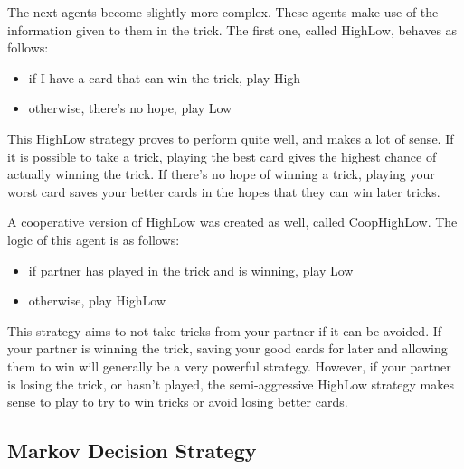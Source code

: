 The next agents become slightly more complex. These agents make use of the information given to them in the trick. The first one,
called HighLow, behaves as follows:
\begin{itemize}[noitemsep, label={}]
    \item if I have a card that can win the trick, play High
    \item otherwise, there's no hope, play Low
\end{itemize}
This HighLow strategy proves to perform quite well, and makes a lot of sense. If it is possible to take a trick, playing the best card
gives the highest chance of actually winning the trick. If there's no hope of winning a trick, playing your worst card
saves your better cards in the hopes that they can win later tricks.

A cooperative version of HighLow was created as well, called CoopHighLow. The logic of this agent is as follows:
\begin{itemize}[noitemsep, label={}]
    \item if partner has played in the trick and is winning, play Low
    \item otherwise, play HighLow
\end{itemize}
This strategy aims to not take tricks from your partner if it can be avoided. If your partner is winning the trick, saving your good cards for
later and allowing them to win will generally be a very powerful strategy. However, if your partner is losing the trick, or hasn't played,
the semi-aggressive HighLow strategy makes sense to play to try to win tricks or avoid losing better cards.


\subsection{Markov Decision Strategy}

